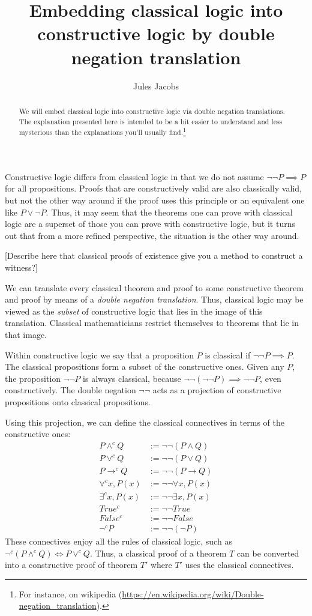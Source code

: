 \documentclass[a4paper, 11pt]{article}
\title{Embedding classical logic into constructive logic by double negation translation}
\author{Jules Jacobs}
\theoremstyle{definition}
\newcommand{\nn}{\neg \neg}
\begin{document}
\maketitle

\begin{abstract}
  We will embed classical logic into constructive logic via double negation translations. The explanation presented here is intended to be a bit easier to understand and less mysterious than the explanations you'll usually find.\footnote{For instance, on wikipedia (\url{https://en.wikipedia.org/wiki/Double-negation_translation}).}
\end{abstract}

Constructive logic differs from classical logic in that we do not assume $\neg \neg P \implies P$ for all propositions. Proofs that are constructively valid are also classically valid, but not the other way around if the proof uses this principle or an equivalent one like $P \vee \neg P$. Thus, it may seem that the theorems one can prove with classical logic are a superset of those you can prove with constructive logic, but it turns out that from a more refined perspective, the situation is the other way around.

[Describe here that classical proofs of existence give you a method to construct a witness?]

We can translate every classical theorem and proof to some constructive theorem and proof by means of a \emph{double negation translation}. Thus, classical logic may be viewed as the \emph{subset} of constructive logic that lies in the image of this translation. Classical mathematicians restrict themselves to theorems that lie in that image.

Within constructive logic we say that a proposition $P$ is classical if $\neg \neg P \implies P$. The classical propositions form a subset of the constructive ones. Given any $P$, the proposition $\neg \neg P$ is always classical, because $\neg \neg (\neg \neg P) \implies \neg \neg P$, even constructively. The double negation $\neg \neg$ acts as a projection of constructive propositions onto classical propositions.

Using this projection, we can define the classical connectives in terms of the constructive ones:
\begin{align*}
P \wedge^c Q &:= \nn (P \wedge Q) \\
P \vee^c Q &:= \nn (P \vee Q) \\
P \to^c Q & := \nn (P \to Q) \\
\forall^c x, P(x) &:= \nn \forall x, P(x) \\
\exists^c x, P(x) &:= \nn \exists x, P(x) \\
True^c &:= \nn True \\
False^c &:= \nn False \\
\neg^c P & := \nn (\neg P)
\end{align*}
These connectives enjoy all the rules of classical logic, such as $\neg^c (P \wedge^c Q) \iff P \vee^c Q$. Thus, a classical proof of a theorem $T$ can be converted into a constructive proof of theorem $T'$ where $T'$ uses the classical connectives.
\end{document}
